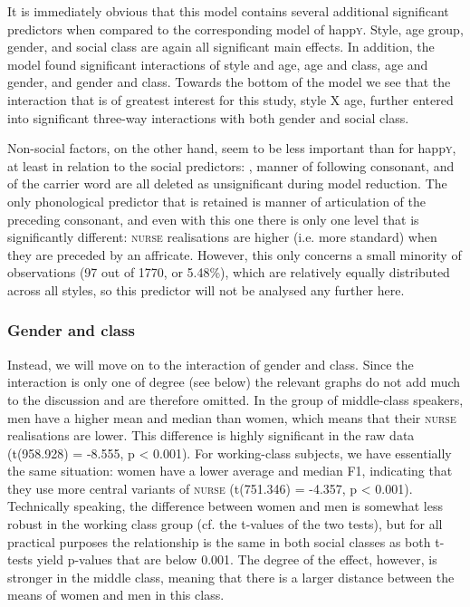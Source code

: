 It is immediately obvious that this model contains several additional significant predictors when compared to the corresponding model of happ\textsc{y}.
Style, age group, gender, and social class are again all significant main effects.
In addition, the model found significant interactions of style and age, age and class, age and gender, and gender and class.
Towards the bottom of the model we see that the interaction that is of greatest interest for this study, style X age, further entered into significant three-way interactions with both gender and social class.

Non-social factors, on the other hand, seem to be less important than for happ\textsc{y}, at least in relation to the social predictors: , manner of following consonant, and  of the carrier word are all deleted as unsignificant during model reduction.
The only phonological predictor that is retained is manner of articulation of the preceding consonant, and even with this one there is only one level that is significantly different: \textsc{nurse} realisations are higher (i.e. more standard) when they are preceded by an affricate.
However, this only concerns a small minority of observations (97 out of 1770, or 5.48\%), which are relatively equally distributed across all styles, so this predictor will not be analysed any further here.

\subsubsection{Gender and class}
\label{sec.prod.res.vow.nurse.f1.genderclass}

Instead, we will move on to the interaction of gender and class.
Since the interaction is only one of degree (see below) the relevant graphs do not add much to the discussion and are therefore omitted.
In the group of middle-class speakers, men have a higher mean and median than women, which means that their \textsc{nurse} realisations are lower.
This difference is highly significant in the raw data (t(958.928) = -8.555, p < 0.001).
For working-class subjects, we have essentially the same situation: women have a lower average and median F1, indicating that they use more central variants of \textsc{nurse} (t(751.346) = -4.357, p < 0.001).
Technically speaking, the difference between women and men is somewhat less robust in the working class group (cf. the t-values of the two tests), but for all practical purposes the relationship is the same in both social classes as both t-tests yield p-values that are below 0.001.
The degree of the effect, however, is stronger in the middle class, meaning that there is a larger distance between the means of women and men in this class.

